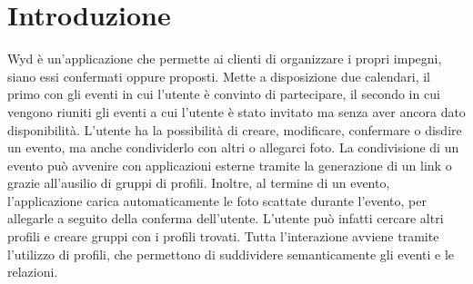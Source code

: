 \section{Introduzione}

Wyd è un'applicazione che permette ai clienti di organizzare i propri impegni, siano essi confermati oppure proposti.\newline
Mette a disposizione due calendari, il primo con gli eventi in cui l'utente è convinto di partecipare, 
il secondo in cui vengono riuniti gli eventi a cui l'utente è stato invitato ma senza aver ancora dato disponibilità.\newline
L'utente ha la possibilità di creare, modificare, confermare o disdire un evento, ma anche condividerlo con altri o allegarci foto.
La condivisione di un evento può avvenire con applicazioni esterne tramite la generazione di un link o grazie all'ausilio di gruppi di profili.
Inoltre, al termine di un evento, l'applicazione carica automaticamente le foto scattate durante l'evento, per allegarle a seguito della conferma dell'utente.\newline  
L'utente può infatti cercare altri profili e creare gruppi con i profili trovati.\newline
Tutta l'interazione avviene tramite l'utilizzo di profili, che permettono di suddividere semanticamente gli eventi e le relazioni.\newline
\newpage